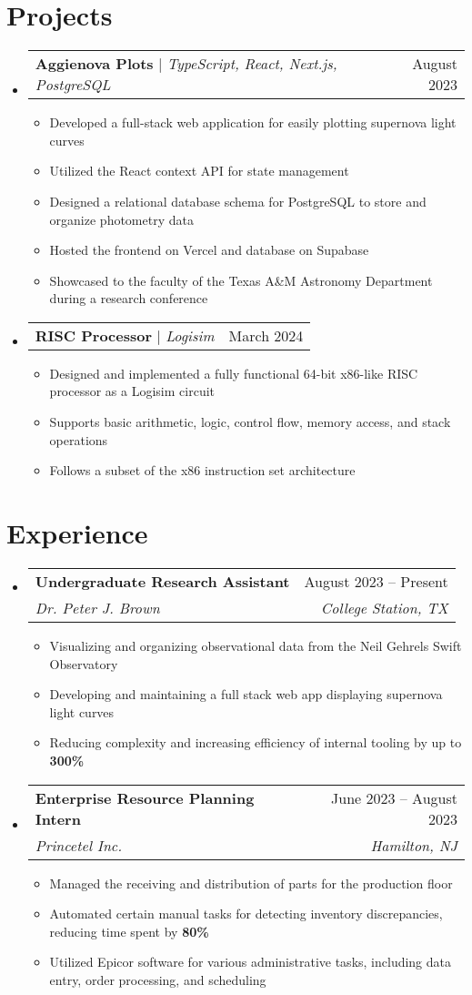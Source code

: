 \documentclass[letterpaper,11pt]{article}
\makeatletter
\newcommand{\resumeItem}[1]{
  \item\small{
    {#1 \vspace{-2pt}}
  }
}
\newcommand{\resumeSubheading}[4]{
  \vspace{-5pt}\item
    \begin{tabular*}{0.97\textwidth}[t]{l@{\extracolsep{\fill}}r}
      \textbf{#1} & #2 \\
      \textit{\small#3} & \textit{\small #4} \\
    \end{tabular*}\vspace{-5pt}
}
\newcommand{\resumeProjectHeading}[2]{
    \item
    \begin{tabular*}{0.97\textwidth}{l@{\extracolsep{\fill}}r}
      \small#1 & #2 \\
    \end{tabular*}\vspace{-7pt}
}
\newcommand{\resumeSubHeadingListStart}{\begin{itemize}[leftmargin=0.15in, label={}]}
\newcommand{\resumeSubHeadingListEnd}{\end{itemize}}
\newcommand{\resumeItemListStart}{\begin{itemize}}
\newcommand{\resumeItemListEnd}{\end{itemize}\vspace{-5pt}}
\makeatother
\begin{document}
\section{Projects}
    \resumeSubHeadingListStart
      \resumeProjectHeading
          {\textbf{Aggienova Plots} $|$ \emph{TypeScript, React, Next.js, PostgreSQL}}{August 2023}
          \resumeItemListStart
            \resumeItem{Developed a full-stack web application for easily plotting supernova light curves}
            \resumeItem{Utilized the React context API for state management}
            \resumeItem{Designed a relational database schema for PostgreSQL to store and organize photometry data}
            \resumeItem{Hosted the frontend on Vercel and database on Supabase}
            \resumeItem{Showcased to the faculty of the Texas A\&M Astronomy Department during a research conference}
          \resumeItemListEnd
      \resumeProjectHeading
        {\textbf{RISC Processor} $|$ \emph{Logisim}}{March 2024}
        \resumeItemListStart
          \resumeItem{Designed and implemented a fully functional 64-bit x86-like RISC processor as a Logisim circuit}
          \resumeItem{Supports basic arithmetic, logic, control flow, memory access, and stack operations}
          \resumeItem{Follows a subset of the x86 instruction set architecture}
        \resumeItemListEnd
    \resumeSubHeadingListEnd

\section{Experience}
  \resumeSubHeadingListStart

    \resumeSubheading
      {Undergraduate Research Assistant}{August 2023 -- Present}
      {Dr. Peter J. Brown}{College Station, TX}
      \resumeItemListStart
        \resumeItem{Visualizing and organizing observational data from the Neil Gehrels Swift Observatory}
        \resumeItem{Developing and maintaining a full stack web app displaying supernova light curves}
        \resumeItem{Reducing complexity and increasing efficiency of internal tooling by up to \textbf{300\%}}
      \resumeItemListEnd

    \resumeSubheading
      {Enterprise Resource Planning Intern}{June 2023 -- August 2023}
      {Princetel Inc.}{Hamilton, NJ}
      \resumeItemListStart
        \resumeItem{Managed the receiving and distribution of parts for the production floor}
        \resumeItem{Automated certain manual tasks for detecting inventory discrepancies, reducing time spent by \textbf{80\%}}
        \resumeItem{Utilized Epicor software for various administrative tasks, including data entry, order processing, and
        scheduling}
    \resumeItemListEnd
  \resumeSubHeadingListEnd
\end{document}
